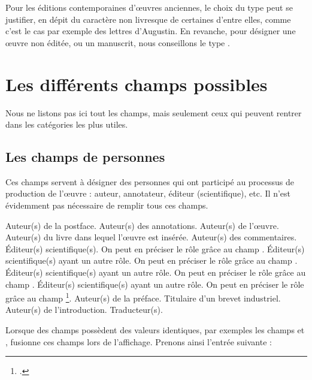 Pour les éditions contemporaines d'œuvres anciennes, le choix du type  peut se justifier, en dépit du caractère non livresque de certaines d'entre elles, comme c'est le cas par exemple des lettres d'Augustin. En revanche, pour désigner  une œuvre non éditée, ou un manuscrit, nous conseillons le type .

\section{Les différents champs possibles}

Nous ne listons pas ici tout les champs, mais seulement ceux qui peuvent rentrer dans les catégories les plus utiles.
\subsection{Les champs de personnes}

Ces champs servent à désigner des personnes qui ont participé au processus de production de l'œuvre : auteur, annotateur, éditeur (scientifique), etc. Il n'est évidemment pas nécessaire de remplir tous ces champs.

\begin{fieldlist}
	 Auteur(s) de la postface. 
   	 Auteur(s) des annotations. 
   	 Auteur(s) de l'œuvre.    
   	 Auteur(s) du livre dans lequel l'œuvre est insérée. 
   	 Auteur(s) des commentaires. 
   	 Éditeur(s) scientifique(s). On peut en préciser le rôle grâce au champ .	
   	 Éditeur(s) scientifique(s) ayant un autre rôle. On peut en préciser le rôle grâce au champ .  
   	 Éditeur(s) scientifique(s) ayant un autre rôle. On peut en préciser le rôle  grâce au champ .  
   	 Éditeur(s) scientifique(s) ayant un autre rôle. On peut en préciser le rôle  grâce au champ \footcite[Pour ces quatres champs, se reporter à][]{biblatex_editortype}.
	 Auteur(s) de la préface.
   	 Titulaire d'un brevet industriel. 
   	 Auteur(s) de l'introduction. 
   	 Traducteur(s). 		
\end{fieldlist}

Lorsque des champs possèdent des valeurs identiques, par exemples les champs  et ,  fusionne ces champs lors de l'affichage. Prenons ainsi l'entrée suivante : 

